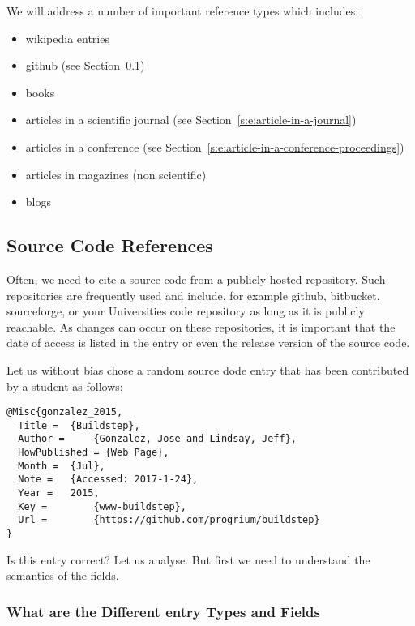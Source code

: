 We will address a number of important reference types which includes:

\begin{itemize}

\item
  wikipedia entries
\item
  github (see Section~\ref{s:e:source-code-references})
\item
  books
\item
  articles in a scientific journal (see Section~\ref{s:e:article-in-a-journal})
\item
  articles in a conference (see Section~\ref{s:e:article-in-a-conference-proceedings})
\item
  articles in magazines (non scientific)
\item
  blogs
\end{itemize}

\subsection{Source Code References}
\label{s:e:source-code-references}

Often, we need to cite a source code from a publicly hosted
repository. Such repositories are frequently used and include, for
example github, bitbucket, sourceforge, or your Universities code
repository as long as it is publicly reachable. As changes can occur on
these repositories, it is important that the date of access is listed in
the entry or even the release version of the source code.

Let us without bias chose a random source dode entry that has been
contributed by a student as follows:

\begin{verbatim}
@Misc{gonzalez_2015,
  Title =  {Buildstep},
  Author =     {Gonzalez, Jose and Lindsay, Jeff},
  HowPublished = {Web Page},
  Month =  {Jul},
  Note =   {Accessed: 2017-1-24},
  Year =   2015,
  Key =        {www-buildstep},
  Url =        {https://github.com/progrium/buildstep}
}
\end{verbatim}

Is this entry correct? Let us analyse. But first we need to understand
the semantics of the fields.

\subsubsection{What are the Different entry Types and Fields}

